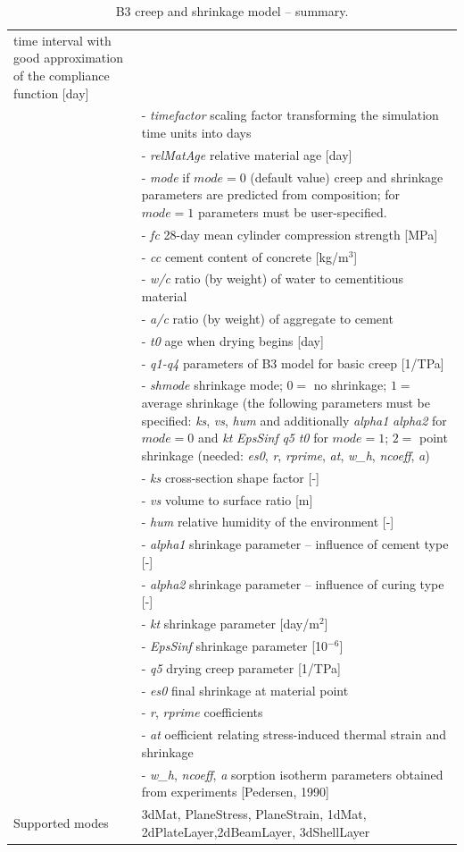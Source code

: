 \documentclass[a4paper]{article}
\newcommand{\param}[1]{{\it #1}}
\begin{document}
\begin{table}[!htb]
\begin{tabular}{|l|p{9cm}|}
time interval with good approximation of the compliance function
[day]\\
&- \param{timefactor} scaling factor transforming the simulation time units into days\\
&- \param{relMatAge} relative material age [day]\\
%
&- \param{mode} if $mode = 0$ (default value) creep and shrinkage parameters are
predicted from composition; for $mode = 1$ parameters must be user-specified.\\
&- \param{fc} 28-day mean cylinder compression strength [MPa]\\
&- \param{cc} cement content of concrete [kg/m$^{3}$]\\
&- \param{w/c} ratio (by weight) of water to cementitious material\\
&- \param{a/c} ratio (by weight) of aggregate to cement \\
&- \param{t0} age when drying begins [day]\\
&- \param{q1-q4} parameters of B3 model for basic creep [1/TPa]\\
%
&- \param{shmode} shrinkage mode;
$0=$ no shrinkage;
$1=$ average shrinkage (the following parameters must be specified:
\param{ks}, \param{vs}, \param{hum} and additionally  \param{alpha1} \param{alpha2} for $mode = 0$
and \param{kt} \param{EpsSinf} \param{q5} \param{t0} for $mode = 1$;  
$2=$ point shrinkage (needed: \param{es0}, \param{r}, \param{rprime},
\param{at}, \param{w\_h}, \param{ncoeff}, \param{a})\\
%
&- \param{ks} cross-section shape factor [-]\\
&- \param{vs} volume to surface ratio [m]\\
&- \param{hum} relative humidity of the environment [-]\\
&- \param{alpha1} shrinkage parameter -- influence of cement type [-]\\
&- \param{alpha2} shrinkage parameter -- influence of curing type [-]\\
&- \param{kt} shrinkage parameter [day/m$^2$]\\
&- \param{EpsSinf} shrinkage parameter [10$^{-6}$]\\
&- \param{q5} drying creep parameter [1/TPa]\\
%
&- \param{es0} final shrinkage at material point\\
&- \param{r}, \param{rprime} coefficients\\
&- \param{at} oefficient relating stress-induced thermal strain and shrinkage\\
&- \param{w\_h}, \param{ncoeff}, \param{a} sorption isotherm parameters obtained from experiments [Pedersen, 1990] \\
%
Supported modes& 3dMat, PlaneStress, PlaneStrain, 1dMat,
2dPlateLayer,2dBeamLayer, 3dShellLayer\\
\hline
\end{tabular}
\caption{B3 creep and shrinkage model -- summary.}
\label{b3_table}
\end{table}
\end{document}
